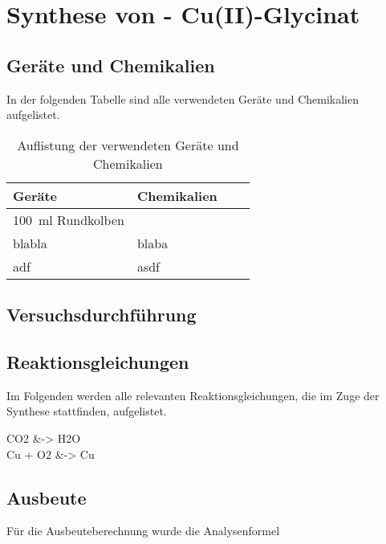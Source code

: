 \pagebreak

\section{Synthese von \ch{[Cu(H2NCH2CO2)2]} - Cu(II)-Glycinat}

\subsection*{Geräte und Chemikalien}

  In der folgenden Tabelle sind alle verwendeten Geräte und Chemikalien aufgelistet. 
  
  \begin{table}[H]
    \centering
    \caption[Materialien- und Chemikalienliste Synthese von , Quelle: Autor]{Auflistung der verwendeten Geräte und Chemikalien}
    \label{tab:Materialien}
        
    \begin{tabular}{@{}l|lp{4.5cm}l@{}}
      \toprule
      Geräte & Chemikalien \\ \midrule
        \SI[mode=text]{100}{\milli\litre} Rundkolben &  \\
        blabla & blaba \\ 
        adf & asdf \\ \bottomrule
    \end{tabular}
  \end{table}
      
\subsection*{Versuchsdurchführung}

\subsection*{Reaktionsgleichungen}
  
  Im Folgenden werden alle relevanten Reaktionsgleichungen, die im Zuge der Synthese stattfinden, aufgelistet. 
  
  \begin{reactions*}
    CO2 &-> H2O \\
    Cu + O2 &-> Cu
  \end{reactions*}
  
\subsection*{Ausbeute}
  Für die Ausbeuteberechnung wurde die Analysenformel 
  
